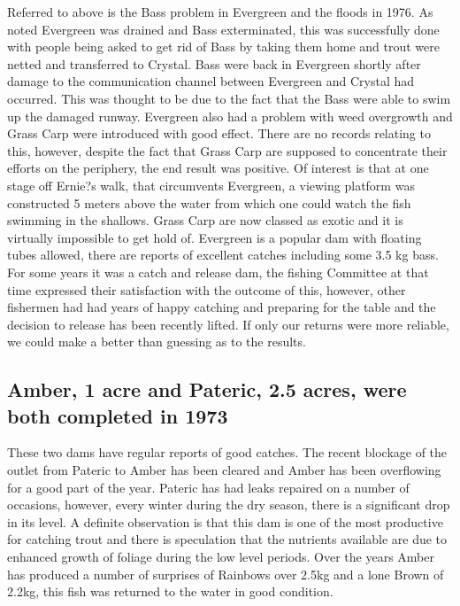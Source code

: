 Referred to above is the Bass problem in Evergreen and the floods in 1976. As noted Evergreen was drained 
and Bass exterminated, this was successfully done with people being asked to get rid of Bass by taking them 
home and trout were netted and transferred to Crystal.  Bass were back in Evergreen shortly after damage to 
the communication channel between Evergreen and Crystal had occurred. This was thought to be due to the 
fact that the Bass were able to swim up the damaged runway. Evergreen also had a problem with weed overgrowth 
and Grass Carp were introduced with good effect. There are no records relating to this, however, despite 
the fact that Grass Carp are supposed to concentrate their efforts on the periphery, the end result was positive. 
Of interest is that at one stage off Ernie?s walk, that circumvents Evergreen, a viewing platform was constructed 
5 meters above the water from which one could watch the fish swimming in the shallows. 
Grass Carp are now classed as exotic and it is virtually impossible to get hold of. Evergreen is a popular dam 
with floating tubes allowed, there are reports of excellent catches including some 3.5 kg bass. 
For some years it  was a catch and release dam, the fishing Committee at that time expressed their satisfaction 
with the outcome of this, however, other fishermen had had years of happy catching and preparing for the 
table and the decision to release has been recently lifted. If only our returns were more reliable, 
we could make a better than guessing as to the results.

\subsection*{Amber, 1 acre and Pateric, 2.5 acres, were both completed in 1973}

These two dams have regular reports of good catches. The recent blockage of the outlet from Pateric to Amber 
has been cleared and Amber has been overflowing for a good part of the year. Pateric has had leaks 
repaired on a number of occasions, however, every winter during the dry season, there is a significant drop in its level. 
A definite observation is that this dam is one of the most productive for catching trout and there is speculation that 
the nutrients available are due to enhanced growth of foliage during the low level periods.
Over the years Amber has produced a number of surprises of Rainbows over 2.5kg and a lone Brown of 2.2kg, 
this fish was returned to the water in good condition.

